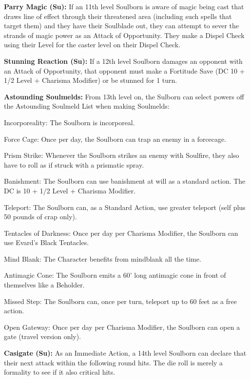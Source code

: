 \textbf{Parry Magic (Su):} If an 11th level Soulborn is aware of magic being cast that draws line of effect through their threatened area (including such spells that target them) and they have their Soulblade out, they can attempt to sever the strands of magic power as an Attack of Opportunity. They make a Dispel Check using their Level for the caster level on their Dispel Check. 

\textbf{Stunning Reaction (Su):} If a 12th level Soulborn damages an opponent with an Attack of Opportunity, that opponent must make a Fortitude Save (DC 10 + 1/2 Level + Charisma Modifier) or be stunned for 1 turn. 

\textbf{Astounding Soulmelds:} From 13th level on, the Sulborn can select powers off the Astounding Soulmeld List when making Soulmelds: 
\begin{itemize*}
\item Incorporeality: The Soulborn is incorporeal. 
\item Force Cage: Once per day, the Soulborn can trap an enemy in a forcecage. 
\item Prism Strike: Whenever the Soulborn strikes an enemy with Soulfire, they also have to roll as if struck with a prismatic spray. 
\item Banishment: The Soulborn can use banishment at will as a standard action. The DC is 10 + 1/2 Level + Charisma Modifier. 
\item Teleport: The Soulborn can, as a Standard Action, use greater teleport (self plus 50 pounds of crap only). 
\item Tentacles of Darkness: Once per day per Charisma Modifier, the Soulborn can use Evard's Black Tentacles. 
\item Mind Blank: The Character benefits from mindblank all the time. 
\item Antimagic Cone: The Soulborn emits a 60' long antimagic cone in front of themselves like a Beholder. 
\item Missed Step: The Soulborn can, once per turn, teleport up to 60 feet as a free action. 
\item Open Gateway: Once per day per Charisma Modifier, the Soulborn can open a gate (travel version only).
\end{itemize*}

\textbf{Casigate (Su):} As an Immediate Action, a 14th level Soulborn can declare that their next attack within the following round hits. The die roll is merely a formality to see if it also critical hits. 

